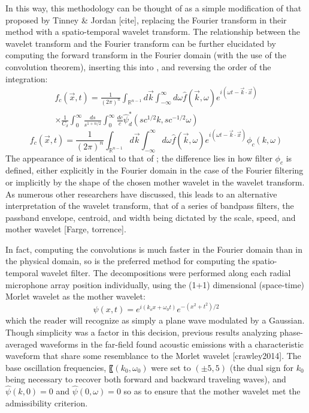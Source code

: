 In this way, this methodology can be thought of as a simple modification of that proposed by Tinney \& Jordan [cite], replacing the Fourier transform in their method with a spatio-temporal wavelet transform. 
The relationship between the wavelet transform and the Fourier transform can be further elucidated by computing the forward transform in the Fourier domain (with the use of the convolution theorem), inserting this into , and reversing the order of the integration:
\begin{multline}
		f_c (\vec{x},t) = \frac{1}{(2 \pi)^n} \int_{\mathbb{R}^{n-1}} d \vec{k} \int_{-\infty}^{\infty} d\omega \hat{f}(\vec{k},\omega) e^{i(\omega t - \vec{k} \cdot \vec{x})} \\ 
		\times \frac{1}{C_\delta} \int_0^\infty \frac{ds}{s^{1 + n/2}} \int_{0}^{\infty} \frac{dc}{c} \hat{\psi}_d^* (sc^{1/2}k,sc^{-1/2} \omega)
\end{multline}
\begin{equation}
	f_c (\vec{x},t) = \frac{1}{(2 \pi)^n} \int_{\mathbb{R}^{n-1}} d \vec{k} \int_{-\infty}^{\infty} d\omega \hat{f}(\vec{k},\omega) e^{i(\omega t - \vec{k} \cdot \vec{x})} \phi_c (k,\omega)
	\label{eq:wavelet_filter_simplified}
\end{equation}
The appearance of  is identical to that of ; the difference lies in how filter $\phi_c$ is defined, either explicitly in the Fourier domain in the case of the Fourier filtering or implicitly by the shape of the chosen mother wavelet in the wavelet transform. 
As numerous other researchers have discussed, this leads to an alternative interpretation of the wavelet transform, that of a series of bandpass filters, the passband envelope, centroid, and width being dictated by the scale, speed, and mother wavelet [Farge, torrence].

In fact, computing the convolutions is much faster in the Fourier domain than in the physical domain, so  is the preferred method for computing the spatio-temporal wavelet filter.
The decompositions were performed along each radial microphone array position individually, using the (1+1) dimensional (space-time) Morlet wavelet as the mother wavelet:
\begin{equation}
	\psi (x,t) = e^{i(k_o x + \omega_0 t)} e^{-(x^2 + t^2)/2}
\end{equation}
which the reader will recognize as simply a plane wave modulated by a Gaussian. 
Though simplicity was a factor in this decision, previous results analyzing phase-averaged waveforms in the far-field found acoustic emissions with a characteristic waveform that share some resemblance to the Morlet wavelet [crawley2014]. 
The base oscillation frequencies, 〖$(k_0,\omega_0)$ were set to $(\pm 5,5)$ (the dual sign for $k_0$ being necessary to recover both forward and backward traveling waves), and $\hat{\psi}(k,0) = 0$ and $\hat{\psi}(0,\omega) = 0$ so as to ensure that the mother wavelet met the admissibility criterion.

